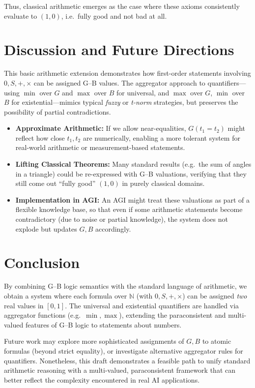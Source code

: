 \documentclass[11pt]{article}
\begin{document}
\noindent
Thus, classical arithmetic emerges as the case where these axioms 
consistently evaluate to $(1,0)$, i.e.\ fully good and not bad at all.

\section{Discussion and Future Directions}

This basic arithmetic extension demonstrates how first-order statements 
involving $0,S,+,\times$ can be assigned G--B values. The aggregator approach 
to quantifiers---using $\min$ over $G$ and $\max$ over $B$ for universal, 
and $\max$ over $G$, $\min$ over $B$ for existential---mimics typical 
\emph{fuzzy} or \emph{t-norm} strategies, but preserves the possibility 
of partial contradictions. 

\begin{itemize}
    \item \textbf{Approximate Arithmetic:} If we allow near-equalities, 
    $G(t_1=t_2)$ might reflect how close $t_1, t_2$ are numerically, 
    enabling a more tolerant system for real-world arithmetic or 
    measurement-based statements.
    \item \textbf{Lifting Classical Theorems:} Many standard results 
    (e.g.\ the sum of angles in a triangle) could be re-expressed 
    with G--B valuations, verifying that they still come out 
    ``fully good'' $(1,0)$ in purely classical domains.
    \item \textbf{Implementation in AGI:} An AGI might treat 
    these valuations as part of a flexible knowledge base, 
    so that even if some arithmetic statements become contradictory 
    (due to noise or partial knowledge), the system does not explode 
    but updates $G,B$ accordingly.
\end{itemize}

\section{Conclusion}

By combining G--B logic semantics with the standard language of arithmetic, 
we obtain a system where each formula over $\mathbb{N}$ (with $0,S,+,\times$) 
can be assigned \emph{two} real values in $[0,1]$. The universal and existential 
quantifiers are handled via aggregator functions (e.g.\ $\min,\max$), 
extending the paraconsistent and multi-valued features of G--B logic 
to statements about numbers. 

Future work may explore more sophisticated assignments of $G,B$ to atomic 
formulas (beyond strict equality), or investigate alternative aggregator 
rules for quantifiers. Nonetheless, this draft demonstrates a feasible path 
to unify standard arithmetic reasoning with a multi-valued, paraconsistent 
framework that can better reflect the complexity encountered in real AI 
applications.
\end{document}
